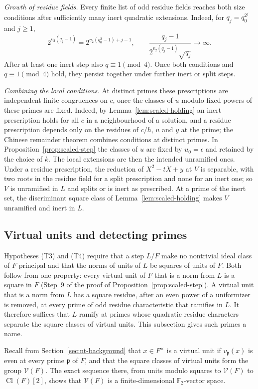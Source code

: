 \documentclass[11pt]{article}
\theoremstyle{plain}
\theoremstyle{definition}
\theoremstyle{remark}
\DeclareMathOperator{\Cl}{Cl}
\newcommand{\F}{\mathbb F}
\begin{document}
\emph{Growth of residue fields.}  Every finite list of odd residue fields
reaches both size conditions after sufficiently many inert quadratic
extensions.  Indeed, for $q_j=q_0^{2^j}$ and $j\ge1$,
\[
 2^{v_2(q_j-1)}=2^{v_2(q_0^2-1)+j-1},\qquad
 \frac{q_j-1}{2^{v_2(q_j-1)}\sqrt{q_j}}\longrightarrow\infty .
\]
After at least one inert step also $q\equiv1\pmod4$.  Once both
conditions and $q\equiv1\pmod4$ hold, they persist together under
further inert or split steps.

\emph{Combining the local conditions.}  At distinct primes these
prescriptions are independent finite congruences on $c$, once the classes
of $u$ modulo fixed powers of these primes are fixed.  Indeed, by
Lemma~\ref{lem:scaled-holding} an inert prescription holds for all $c$ in
a neighbourhood of a solution, and a residue prescription depends only on
the residues of $c/h$, $u$ and $y$ at the prime; the Chinese remainder
theorem combines conditions at distinct primes.  In
Proposition~\ref{prop:scaled-step} the classes of $u$ are fixed by
$u_0=\epsilon$ and retained by the choice of $k$.  The local extensions
are then the intended unramified ones.  Under a residue prescription, the
reduction of $X^2-tX+y$ at $V$ is separable, with two roots in the residue
field for a split prescription and none for an inert one; so $V$ is
unramified in $L$ and splits or is inert as prescribed.  At a prime of
the inert set, the discriminant square class of
Lemma~\ref{lem:scaled-holding} makes $V$ unramified and inert in $L$.

\subsection{Virtual units and detecting primes}\label{sec:detecting}
Hypotheses (T3) and (T4) require that a step $L/F$ make no nontrivial ideal
class of $F$ principal and that the norms of units of $L$ be squares of
units of $F$.  Both follow from one property: every virtual unit of $F$
that is a norm from $L$ is a square in $F$ (Step~9 of the proof of
Proposition~\ref{prop:scaled-step}).  A virtual unit that is a norm from
$L$ has a square residue, after an even power of a uniformizer is
removed, at every prime of odd residue characteristic that ramifies in
$L$.  It therefore
suffices that $L$ ramify at primes whose quadratic residue characters
separate the square classes of virtual units.  This subsection gives such
primes a name.

Recall from Section~\ref{sec:nt-background} that $x\in F^\times$ is a
virtual unit if $v_{\mathfrak p}(x)$ is even at every prime $\mathfrak p$
of $F$, and that the square classes of virtual units form the group
$\mathcal V(F)$.  The exact sequence there, from units modulo squares to
$\mathcal V(F)$ to $\Cl(F)[2]$, shows that $\mathcal V(F)$ is a
finite-dimensional $\F_2$-vector space.
\end{document}
